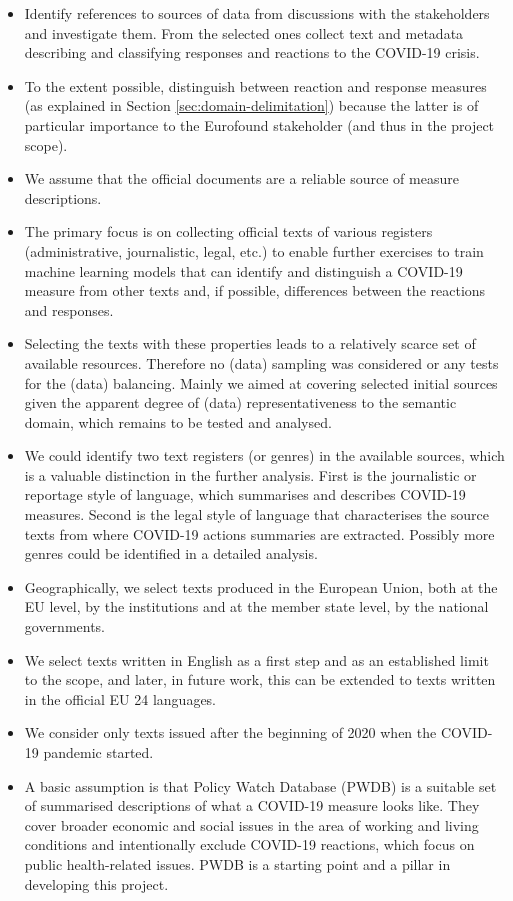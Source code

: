 \begin{itemize}
	\item Identify references to sources of data from discussions with the stakeholders and investigate them. From the selected ones collect text and metadata describing and classifying responses and reactions to the COVID-19 crisis. 
	\item To the extent possible, distinguish between reaction and response measures (as explained in Section \ref{sec:domain-delimitation}) because the latter is of particular importance to the Eurofound stakeholder (and thus in the project scope). 
	\item We assume that the official documents are a reliable source of measure descriptions.
	\item The primary focus is on collecting official texts of various registers (administrative, journalistic, legal, etc.) to enable further exercises to train machine learning models that can identify and distinguish a COVID-19 measure from other texts and, if possible, differences between the reactions and responses.
	\item Selecting the texts with these properties leads to a relatively scarce set of available resources. Therefore no (data) sampling was considered or any tests for the (data) balancing. Mainly we aimed at covering selected initial sources given the apparent degree of (data) representativeness to the semantic domain, which remains to be tested and analysed.
	\item We could identify two text registers (or genres) in the available sources, which is a valuable distinction in the further analysis. First is the journalistic or reportage style of language, which summarises and describes COVID-19 measures. Second is the legal style of language that characterises the source texts from where COVID-19 actions summaries are extracted. Possibly more genres could be identified in a detailed analysis. 
	\item Geographically, we select texts produced in the European Union, both at the EU level, by the institutions and at the member state level, by the national governments. 
	\item We select texts written in English as a first step and as an established limit to the scope, and later, in future work, this can be extended to texts written in the official EU 24 languages.
	\item We consider only texts issued after the beginning of 2020 when the COVID-19 pandemic started.

	\item A basic assumption is that Policy Watch Database (PWDB) is a suitable set of summarised descriptions of what a COVID-19 measure looks like. They cover broader economic and social issues in the area of working and living conditions and intentionally exclude COVID-19 reactions, which focus on public health-related issues. PWDB is a starting point and a pillar in developing this project. 
\end{itemize}

